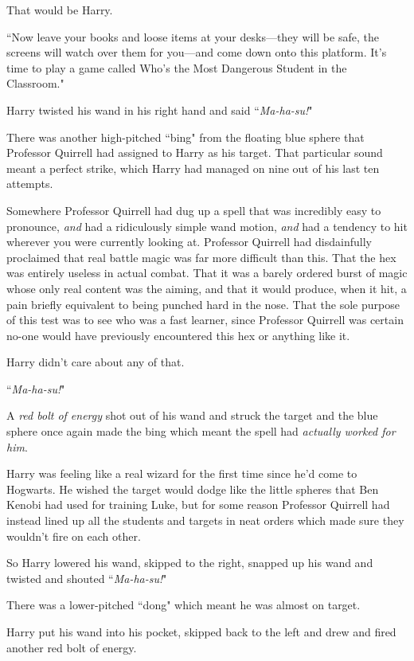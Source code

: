 That would be Harry.

``Now leave your books and loose items at your desks—they will be safe, the screens will watch over them for you—and come down onto this platform. It's time to play a game called Who's the Most Dangerous Student in the Classroom."

\later

Harry twisted his wand in his right hand and said ``\emph{Ma-ha-su!}"

There was another high-pitched ``bing" from the floating blue sphere that Professor Quirrell had assigned to Harry as his target. That particular sound meant a perfect strike, which Harry had managed on nine out of his last ten attempts.

Somewhere Professor Quirrell had dug up a spell that was incredibly easy to pronounce, \emph{and} had a ridiculously simple wand motion, \emph{and} had a tendency to hit wherever you were currently looking at. Professor Quirrell had disdainfully proclaimed that real battle magic was far more difficult than this. That the hex was entirely useless in actual combat. That it was a barely ordered burst of magic whose only real content was the aiming, and that it would produce, when it hit, a pain briefly equivalent to being punched hard in the nose. That the sole purpose of this test was to see who was a fast learner, since Professor Quirrell was certain no-one would have previously encountered this hex or anything like it.

Harry didn't care about any of that.

``\emph{Ma-ha-su!}"

A \emph{red bolt of energy} shot out of his wand and struck the target and the blue sphere once again made the bing which meant the spell had \emph{actually worked for him}.

Harry was feeling like a real wizard for the first time since he'd come to Hogwarts. He wished the target would dodge like the little spheres that Ben Kenobi had used for training Luke, but for some reason Professor Quirrell had instead lined up all the students and targets in neat orders which made sure they wouldn't fire on each other.

So Harry lowered his wand, skipped to the right, snapped up his wand and twisted and shouted ``\emph{Ma-ha-su!}"

There was a lower-pitched ``dong" which meant he was almost on target.

Harry put his wand into his pocket, skipped back to the left and drew and fired another red bolt of energy.

